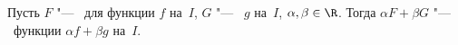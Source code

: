 
  Пусть $F$ "--- \op\ для функции $f$ на~$I$, $G$ "--- \op\ $g$ на~$I$, $\alpha,\beta \in\R$.
  Тогда $\alpha F+\beta G$ "--- \op\ функции $\alpha f+ \beta g$ на~$I$.
